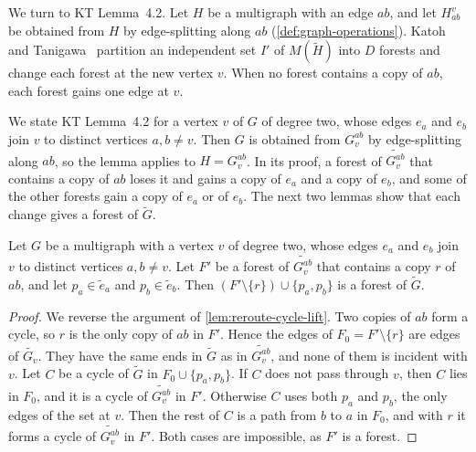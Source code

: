 We turn to KT Lemma~4.2. Let $H$ be a multigraph with an edge $ab$, and
let $H_{ab}^v$ be obtained from $H$ by edge-splitting along $ab$
(\cref{def:graph-operations}). Katoh and
Tanigawa~\cite[pp.~660--661]{katohTanigawa2011} partition an independent
set $I'$ of $M(\tilde H)$ into $D$ forests and change each forest at the
new vertex $v$. When no forest contains a copy of $ab$, each forest
gains one edge at $v$.

We state KT Lemma~4.2 for a vertex $v$ of $G$ of degree two, whose edges
$e_a$ and $e_b$ join $v$ to distinct vertices $a, b \neq v$. Then $G$ is
obtained from $G_v^{ab}$ by edge-splitting along $ab$, so the lemma
applies to $H = G_v^{ab}$. In its proof, a forest of
$\widetilde{G_v^{ab}}$ that contains a copy of $ab$ loses it and gains a
copy of $e_a$ and a copy of $e_b$, and some of the other forests gain a
copy of $e_a$ or of $e_b$. The next two lemmas show that each change
gives a forest of $\tilde G$.

\begin{lemma}
  \label{lem:reverse-reroute-cycle-lift}
  \leanok
  Let $G$ be a multigraph with a vertex $v$ of degree two, whose edges
  $e_a$ and $e_b$ join $v$ to distinct vertices $a, b \neq v$. Let $F'$
  be a forest of $\widetilde{G_v^{ab}}$ that contains a copy $r$ of $ab$,
  and let $p_a \in \tilde e_a$ and $p_b \in \tilde e_b$. Then
  $(F' \setminus \{r\}) \cup \{p_a, p_b\}$ is a forest of $\tilde G$.
\end{lemma}
\begin{proof}
  \leanok
  We reverse the argument of \cref{lem:reroute-cycle-lift}. Two copies
  of $ab$ form a cycle, so $r$ is the only copy of $ab$ in $F'$. Hence the
  edges of $F_0 = F' \setminus \{r\}$ are edges of $\widetilde{G_v}$.
  They have the same ends in $\tilde G$ as in $\widetilde{G_v^{ab}}$,
  and none of them is incident with $v$. Let $C$ be a cycle of $\tilde G$
  in $F_0 \cup \{p_a, p_b\}$. If $C$ does not pass through $v$, then $C$
  lies in $F_0$, and it is a cycle of $\widetilde{G_v^{ab}}$ in $F'$.
  Otherwise $C$ uses both $p_a$ and $p_b$, the only edges of the set at
  $v$. Then the rest of $C$ is a path from $b$ to $a$ in $F_0$, and with
  $r$ it forms a cycle of $\widetilde{G_v^{ab}}$ in $F'$. Both cases are
  impossible, as $F'$ is a forest.
\end{proof}

